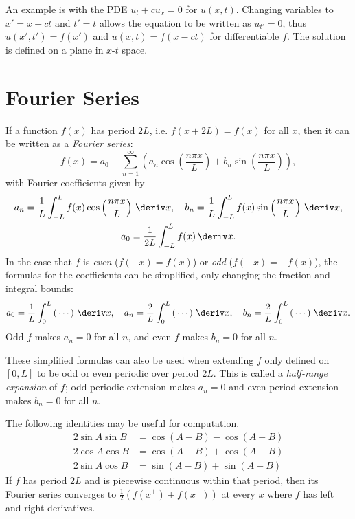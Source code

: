 \documentclass[10pt, a4paper]{article}
\begin{document}
\begin{landscape}
\begin{multicols}{2}
    An example is with the PDE \(u_t + c u_x = 0\) for \(u(x, t)\). Changing variables to
    \(x' = x - ct\) and \(t' = t\) allows the equation to be written as \(u_{t'} = 0\), thus
    \(u(x', t') = f(x')\) and \(u(x, t) = f(x-ct)\) for differentiable \(f\). The solution is
    defined on a plane in \(x\)-\(t\) space.
    
    \section{Fourier Series}

    If a function \(f(x)\) has period \(2L\), i.e. \(f(x + 2L) = f(x)\) for all \(x\), then
    it can be written as a \emph{Fourier series}:
    \[
        f(x)
        = a_0 + \sum_{n=1}^{\infty} \left(
            a_n \cos\left(\frac{n \pi x}{L}\right)
            + b_n \sin\left(\frac{n \pi x}{L}\right)
        \right),
    \]
    with Fourier coefficients given by
    \begin{gather*}
        a_n = \frac{1}{L} \int_{-L}^{L} f(x) \cos\left(\frac{n \pi x}{L}\right) \,\deriv x,
        \quad
        b_n = \frac{1}{L} \int_{-L}^{L} f(x) \sin\left(\frac{n \pi x}{L}\right) \,\deriv x, \\
        a_0 = \frac{1}{2L} \int_{-L}^{L} f(x) \,\deriv x.
    \end{gather*}
    In the case that \(f\) is \emph{even} (\(f(-x) = f(x)\)) or \emph{odd} (\(f(-x) = -f(x)\)), the formulas for
    the coefficients can be simplified, only changing the fraction and integral bounds:
    \[
        a_0 = \frac{1}{L} \int_0^L \left(\,\cdots\right) \,\deriv x,
        \quad
        a_n = \frac{2}{L} \int_0^L \left(\,\cdots\right) \,\deriv x,
        \quad
        b_n = \frac{2}{L} \int_0^L \left(\,\cdots\right) \,\deriv x.
    \]
    Odd \(f\) makes \(a_n = 0\) for all \(n\), and even \(f\) makes \(b_n = 0\) for all \(n\).

    These simplified formulas can also be used when extending \(f\) only defined on \([0, L]\) to be
    odd or even periodic over period \(2L\). This is called a \emph{half-range expansion} of \(f\);
    odd periodic extension makes \(a_n = 0\) and even period extension makes \(b_n = 0\) for all \(n\).
    
    The following identities may be useful for computation.
    \begin{align*}
        2 \sin A \sin B &= \cos(A - B) - \cos(A + B) \\
        2 \cos A \cos B &= \cos(A - B) + \cos(A + B) \\
        2 \sin A \cos B &= \sin(A - B) + \sin(A + B)
    \end{align*}
    If \(f\) has period \(2L\) and is piecewise continuous within that period, then its Fourier series converges
    to \(\frac{1}{2}(f(x^{+}) + f(x^{-}))\) at every \(x\) where \(f\) has left and right derivatives.


\end{multicols}
\end{landscape}
\end{document}
